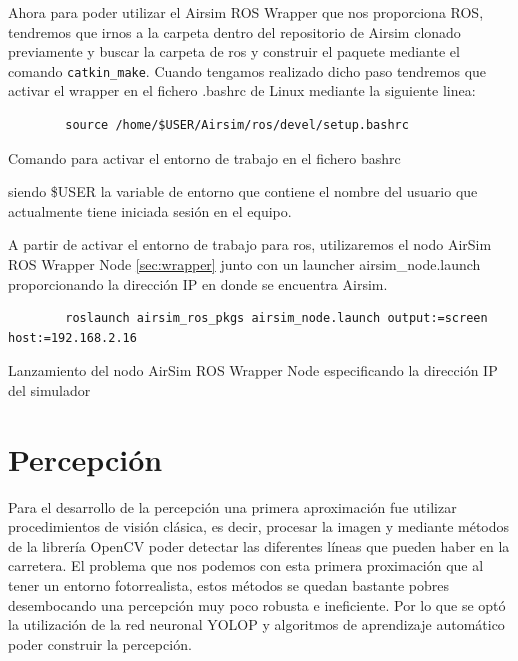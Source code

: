 \begin{enumerate}
    Ahora para poder utilizar el Airsim ROS Wrapper que nos proporciona ROS, tendremos que irnos a la carpeta dentro del repositorio de Airsim clonado previamente y buscar la carpeta de ros y construir el paquete 
    mediante el comando \texttt{catkin\_make}. Cuando tengamos realizado dicho paso tendremos que activar el wrapper en el fichero .bashrc de Linux mediante la siguiente linea: \newline

    \begin{code}  [H]
      \begin{lstlisting}
        source /home/$USER/Airsim/ros/devel/setup.bashrc
      \end{lstlisting}
      \caption[bash]{Comando para activar el entorno de trabajo en el fichero bashrc}
      \label{cod:bashrc}
    \end{code} 


     siendo \$USER la variable de entorno que contiene el nombre del usuario que actualmente tiene iniciada sesión en el equipo.

     A partir de activar el entorno de trabajo para ros, utilizaremos el nodo AirSim ROS Wrapper Node \ref{sec:wrapper} junto con un launcher airsim\_node.launch proporcionando
     la dirección IP en donde se encuentra Airsim.\newline

     \begin{code}  [H]
      \begin{lstlisting}
        roslaunch airsim_ros_pkgs airsim_node.launch output:=screen host:=192.168.2.16
      \end{lstlisting}
      \caption[comando]{Lanzamiento del nodo AirSim ROS Wrapper Node especificando la dirección IP del simulador}
      \label{cod:roslaunch}
    \end{code} 

  \end{enumerate}

\section{Percepción}
\label{sec:Percepción}
Para el desarrollo de la percepción una primera aproximación fue utilizar
procedimientos de visión clásica, es decir, procesar la imagen y mediante métodos de la librería OpenCV
poder detectar las diferentes líneas que pueden haber en la carretera. El problema que nos podemos con esta primera proximación que al tener un 
entorno fotorrealista, estos métodos se quedan bastante pobres desembocando una percepción muy poco robusta e ineficiente. Por lo que se optó la utilización
de la red neuronal YOLOP y algoritmos de aprendizaje automático poder construir la percepción. \newline

